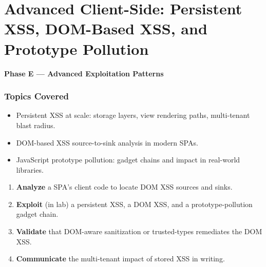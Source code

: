 \documentclass[11pt,letterpaper,oneside]{report}
\begin{document}
\chapter{Advanced Client-Side: Persistent XSS, DOM-Based XSS, and Prototype Pollution}
\textbf{Phase E --- Advanced Exploitation Patterns}

\subsection*{Topics Covered}
\begin{itemize}
  \item Persistent XSS at scale: storage layers, view rendering paths, multi-tenant blast radius.
  \item DOM-based XSS source-to-sink analysis in modern SPAs.
  \item JavaScript prototype pollution: gadget chains and impact in real-world libraries.
\end{itemize}

\begin{outcomes}
\begin{enumerate}
  \item \textbf{Analyze} a SPA's client code to locate DOM XSS sources and sinks.
  \item \textbf{Exploit} (in lab) a persistent XSS, a DOM XSS, and a prototype-pollution gadget chain.
  \item \textbf{Validate} that DOM-aware sanitization or trusted-types remediates the DOM XSS.
  \item \textbf{Communicate} the multi-tenant impact of stored XSS in writing.
\end{enumerate}
\end{outcomes}
\end{document}
